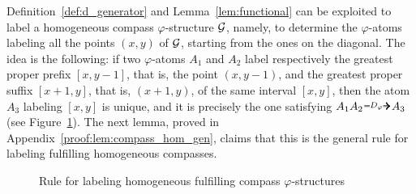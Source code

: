 



Definition~\ref{def:d_generator} and Lemma~\ref{lem:functional} can be exploited to label a homogeneous compass $\varphi$-structure $\mathcal{G}$, namely, to determine the $\varphi$-atoms labeling all the points $(x,y)$ of $\mathcal{G}$, starting from the ones on the diagonal.
The idea is the following: if two $\varphi$-atoms $A_1$ and $A_2$ label respectively the greatest proper prefix $[x,y-1]$, that is, the point $(x,y-1)$, and the greatest proper suffix $[x+1,y]$, that is, $(x+1,y)$, of the same interval $[x,y]$,  
then the atom $A_3$ labeling $[x,y]$ is unique, and it is precisely the one satisfying $A_1A_2\genDphi A_3$ (see Figure~\ref{fig:labelling}). The next lemma, proved in Appendix~\ref{proof:lem:compass_hom_gen}, claims that this is the general rule for labeling fulfilling homogeneous compasses.

\begin{figure}[tb]
    \centering
    
    \caption{Rule for labeling homogeneous fulfilling compass $\varphi$-structures}
    \label{fig:labelling}
\end{figure}

